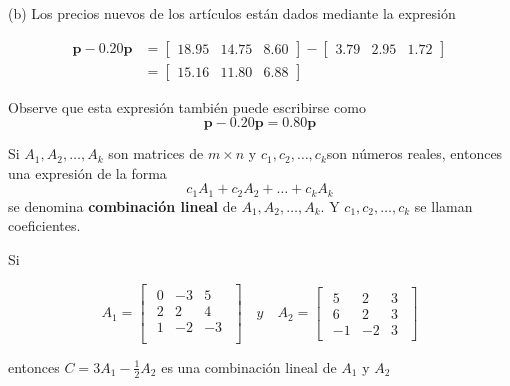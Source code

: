 \documentclass{article}
\begin{document}
(b) Los precios nuevos de los artículos están dados mediante la expresión

$$ \begin{aligned}
\mathbf{p}-0.20 \mathbf{p} & =\left[\begin{array}{lll}
18.95 & 14.75 & 8.60
\end{array}\right]-\left[\begin{array}{lll}
3.79 & 2.95 & 1.72
\end{array}\right] \\
& =\left[\begin{array}{lll}
15.16 & 11.80 & 6.88
\end{array}\right] 
\end{aligned} $$

Observe que esta expresión también puede escribirse como
$$\mathbf{p}-0.20 \mathbf{p}=0.80 \mathbf{p}$$

\begin{tcolorbox}[colback=blue!10!white,colframe=blue!60!black,title=Combinación Lineal]
    Si $A_1,A_2,\dots, A_k$ son matrices de $m \times n$ y $c_1,c_2,\dots, c_k$son números reales, entonces una expresión de la forma $$c_1A_1 + c_2A_2 + \dots + c_kA_k$$ se denomina \textbf{combinación lineal} de $A_1, A_2,\dots , A_k$. Y $c_1, c_2, \dots, c_k$ se llaman coeficientes.
\end{tcolorbox}

Si

\begin{equation*}
   A_1=\begin{bmatrix}
        \begin{array}{rrr}
            0 &-3 & 5\\
            2 & 2 & 4\\
            1 &-2 &-3\\
        \end{array}
    \end{bmatrix}
    \quad y \quad 
    A_2=\begin{bmatrix}
        \begin{array}{rrr}
            5 & 2 & 3\\
            6 & 2 & 3\\
            -1& -2& 3  
        \end{array}
    \end{bmatrix}
\end{equation*}

entonces $C= 3A_1 - \frac{1}{2}A_2$ es una combinación lineal de $A_1$ y $A_2$
\end{document}
